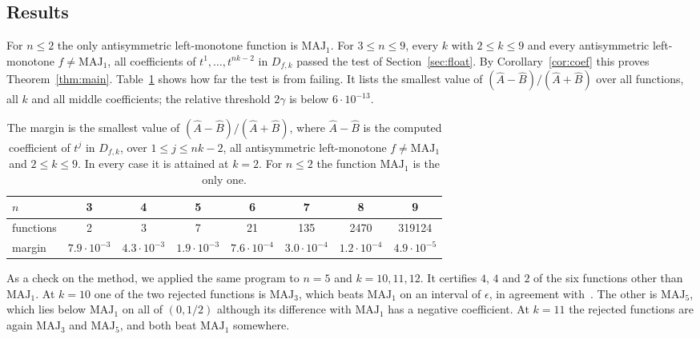 \documentclass[11pt]{amsart}
\theoremstyle{remark}
\newcommand{\MAJ}{\mathrm{MAJ}}
\begin{document}
\subsection*{Results}
For $n\le2$ the only antisymmetric left-monotone function is $\MAJ_1$. For $3\le n\le 9$, every $k$ with
$2\le k\le 9$ and every antisymmetric left-monotone $f\ne\MAJ_1$, all coefficients
of $t^1,\dots,t^{nk-2}$ in $D_{f,k}$ passed the test of Section~\ref{sec:float}. By Corollary~\ref{cor:coef} this
proves Theorem~\ref{thm:main}. Table~\ref{tab:margin} shows how far the test is from failing. It lists the smallest
value of $(\hat A-\hat B)/(\hat A+\hat B)$ over all functions, all $k$ and all middle coefficients; the relative
threshold $2\gamma$ is below $6\cdot10^{-13}$.

\begin{table}[tbp]
\centering
\small
\setlength{\tabcolsep}{4pt}
\begin{tabular}{lccccccc}
\toprule
$n$ & 3 & 4 & 5 & 6 & 7 & 8 & 9\\\midrule
functions & 2 & 3 & 7 & 21 & 135 & 2470 & 319124\\
margin & $7.9\cdot10^{-3}$ & $4.3\cdot10^{-3}$ & $1.9\cdot10^{-3}$ & $7.6\cdot10^{-4}$ &
$3.0\cdot10^{-4}$ & $1.2\cdot10^{-4}$ & $4.9\cdot10^{-5}$\\\bottomrule
\end{tabular}
\medskip
\caption{The margin is the smallest value of $(\hat A-\hat B)/(\hat A+\hat B)$, where $\hat A-\hat B$ is the computed
coefficient of $t^j$ in $D_{f,k}$, over $1\le j\le nk-2$, all antisymmetric left-monotone $f\ne\MAJ_1$ and
$2\le k\le 9$. In every case it is attained
at $k=2$. For $n\le2$ the function $\MAJ_1$ is the only one.}
\label{tab:margin}
\end{table}

As a check on the method, we applied the same program to $n=5$ and $k=10,11,12$. It certifies $4$, $4$ and $2$ of the
six functions other than $\MAJ_1$. At $k=10$ one of the two rejected functions is $\MAJ_3$, which beats $\MAJ_1$ on an
interval of $\epsilon$, in agreement with~\cite[Fact~5.1]{MO05}. The other is $\MAJ_5$, which lies below $\MAJ_1$ on
all of $(0,1/2)$ although its difference with $\MAJ_1$ has a negative coefficient. At $k=11$ the rejected functions
are again $\MAJ_3$ and $\MAJ_5$, and both beat $\MAJ_1$ somewhere.
\end{document}
